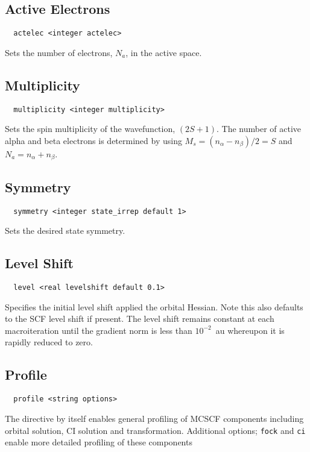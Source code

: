 \subsection{Active Electrons}
\begin{verbatim}
  actelec <integer actelec>
\end{verbatim}
Sets the number of electrons, $N_{a}$, in the active space.

\subsection{Multiplicity}
\begin{verbatim}
  multiplicity <integer multiplicity>
\end{verbatim}
Sets the spin multiplicity of the wavefunction, $(2S + 1)$. The number
of active alpha and beta electrons is determined by using $M_{s} =
(n_{\alpha} - n_{\beta})/2 = S$ and $N_{a} = n_{\alpha} + n_{\beta}$.

\subsection{Symmetry}
\begin{verbatim}
  symmetry <integer state_irrep default 1>
\end{verbatim}
Sets the desired state symmetry.

\subsection{Level Shift}
\begin{verbatim}
  level <real levelshift default 0.1>
\end{verbatim}
Specifies the initial level shift applied the orbital Hessian. Note
this also defaults to the SCF level shift if present. The level shift
remains constant at each macroiteration until the gradient norm is
less than $10^{-2}$~au whereupon it is rapidly reduced to zero.

\subsection{Profile}
\begin{verbatim}
  profile <string options>
\end{verbatim}
The directive by itself enables general profiling of MCSCF components
including orbital solution, CI solution and transformation. Additional
options; \verb+fock+ and \verb+ci+ enable more detailed profiling of
these components

